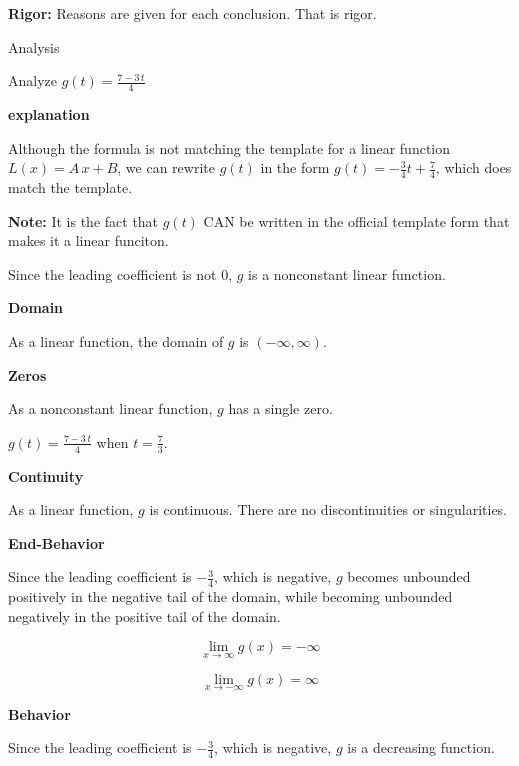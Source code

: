 \documentclass{ximera}
\begin{document}
\textbf{Rigor:} Reasons are given for each conclusion. That is rigor. 













\begin{example} Analysis

Analyze $g(t) = \frac{7 - 3 \, t}{4}$  

\textbf{\textcolor{red!75!green}{explanation}} 


Although the formula is not matching the template for a linear function $L(x) = A \, x + B$, we can rewrite $g(t)$ in the form $g(t) = -\frac{3}{4} t + \frac{7}{4}$, which does match the template. 

\textbf{Note:} It is the fact that $g(t)$ CAN be written in the official template form that makes it a linear funciton. 



Since the leading coefficient is not $0$, $g$ is a nonconstant linear function.



\textbf{Domain} 

As a linear function, the domain of $g$ is $(-\infty, \infty)$.


\textbf{Zeros} 

As a nonconstant linear function, $g$ has a single zero.

$g(t) = \frac{7 - 3 \, t}{4}$ when $t = \frac{7}{3}$. 


\textbf{Continuity} 

As a linear function, $g$ is continuous.  There are no discontinuities or singularities. 



\textbf{End-Behavior} 

Since the leading coefficient is $-\frac{3}{4}$, which is negative, $g$ becomes unbounded positively in the negative tail of the domain, while becoming unbounded negatively in the positive tail of the domain.



\[
\lim\limits_{x \to \infty} g(x) = -\infty
\]

\[
\lim\limits_{x \to -\infty} g(x) = \infty
\]





\textbf{Behavior} 

Since the leading coefficient is $-\frac{3}{4}$, which is negative, $g$ is a decreasing function. 




\end{example}
\end{document}
